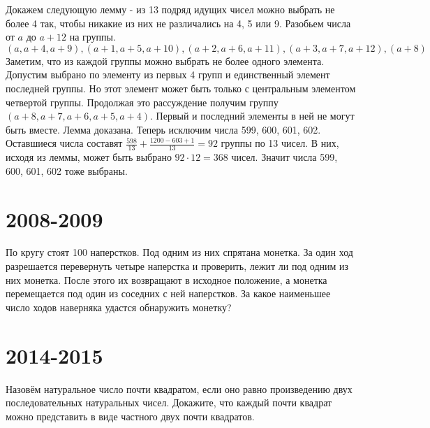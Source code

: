\documentclass[11pt, a4paper]{template}
\begin{document}
\begin{solution}
Докажем следующую лемму - из 13 подряд идущих чисел можно выбрать не более 4 так, чтобы никакие из них не различались на 4, 5 или 9. Разобьем числа от $a$ до $a + 12$ на группы.
$$
(a, a + 4, a + 9), (a + 1, a + 5, a + 10), (a + 2, a + 6, a + 11), (a + 3, a + 7, a + 12), (a + 8) 
$$
Заметим, что из каждой группы можно выбрать не более одного элемента. Допустим выбрано по элементу из первых 4 групп и единственный элемент последней группы. Но  этот элемент может быть только с центральным элементом четвертой группы. Продолжая это рассуждение получим группу $(a + 8, a + 7, a + 6, a + 5, a + 4)$. Первый и последний элементы в ней не могут быть вместе. Лемма доказана. Теперь исключим числа 599, 600, 601, 602. Оставшиеся числа составят $\frac{598}{13} + \frac{1200 - 603 + 1}{13} = 92$ группы по 13 чисел.  В них, исходя из леммы, может быть выбрано $92 \cdot 12 = 368$ чисел. Значит числа 599, 600, 601, 602 тоже выбраны. 
\end{solution}

\chapter{2008-2009}

\begin{exercise}
По кругу стоят 100 наперстков. Под одним из них спрятана монетка. За один ход разрешается перевернуть четыре наперстка и проверить, лежит ли под одним из них монетка. После этого их возвращают в исходное положение, а монетка перемещается под один из соседних с ней наперстков. За какое наименьшее число ходов наверняка удастся обнаружить монетку?
\end{exercise}

\chapter{2014-2015}

\begin{exercise}
Назовём натуральное число почти квадратом, если оно равно произведению двух последовательных натуральных чисел. Докажите, что каждый почти квадрат можно представить в виде частного двух почти квадратов.
\end{exercise}
\end{document}
